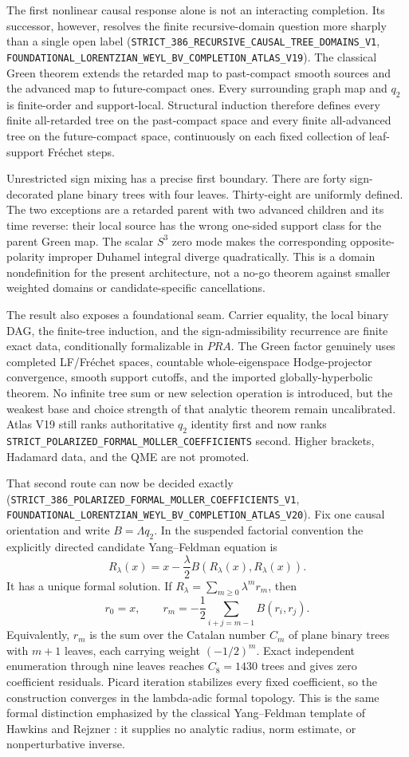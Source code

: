 \documentclass[11pt]{article}
\theoremstyle{definition}
\theoremstyle{remark}
\newcommand{\cert}[1]{\nolinkurl{#1}}
\begin{document}
The first nonlinear causal response alone is not an interacting completion.  Its successor,
however, resolves the finite recursive-domain question more sharply than a
single open label
(\cert{STRICT_386_RECURSIVE_CAUSAL_TREE_DOMAINS_V1},
\cert{FOUNDATIONAL_LORENTZIAN_WEYL_BV_COMPLETION_ATLAS_V19}).  The classical
Green theorem \cite{Baer2015} extends the retarded map to past-compact smooth sources and the
advanced map to future-compact ones.  Every surrounding graph map and
\(q_2\) is finite-order and support-local.  Structural induction therefore
defines every finite all-retarded tree on the past-compact space and every
finite all-advanced tree on the future-compact space, continuously on each
fixed collection of leaf-support Fréchet steps.

Unrestricted sign mixing has a precise first boundary.  There are forty
sign-decorated plane binary trees with four leaves.  Thirty-eight are
uniformly defined.  The two exceptions are a retarded parent with two
advanced children and its time reverse: their local source has the wrong
one-sided support class for the parent Green map.  The scalar \(S^3\) zero
mode makes the corresponding opposite-polarity improper Duhamel integral
diverge quadratically.  This is a domain nondefinition for the present
architecture, not a no-go theorem against smaller weighted domains or
candidate-specific cancellations.

The result also exposes a foundational seam.  Carrier equality, the local
binary DAG, the finite-tree induction, and the sign-admissibility recurrence
are finite exact data, conditionally formalizable in \(PRA\).  The Green
factor genuinely uses completed LF/Fréchet spaces, countable
whole-eigenspace Hodge-projector convergence, smooth support cutoffs, and the
imported globally-hyperbolic theorem.  No infinite tree sum or new selection
operation is introduced, but the weakest base and choice strength of that
analytic theorem remain uncalibrated.  Atlas V19 still ranks authoritative
\(q_2\) identity first and now ranks
\cert{STRICT_POLARIZED_FORMAL_MOLLER_COEFFICIENTS} second.  Higher brackets,
Hadamard data, and the QME are not promoted.

That second route can now be decided exactly
(\cert{STRICT_386_POLARIZED_FORMAL_MOLLER_COEFFICIENTS_V1},
\cert{FOUNDATIONAL_LORENTZIAN_WEYL_BV_COMPLETION_ATLAS_V20}).  Fix one causal
orientation and write $B=\Lambda q_2$.  In the suspended factorial
convention the explicitly directed candidate Yang--Feldman equation is
\[
 R_\lambda(x)=x-\frac{\lambda}{2}B(R_\lambda(x),R_\lambda(x)).
\]
It has a unique formal solution.  If
$R_\lambda=\sum_{m\geq0}\lambda^m r_m$, then
\[
 r_0=x,\qquad
 r_m=-\frac12\sum_{i+j=m-1}B(r_i,r_j).
\]
Equivalently, $r_m$ is the sum over the Catalan number $C_m$ of plane binary
trees with $m+1$ leaves, each carrying weight $(-1/2)^m$.  Exact independent
enumeration through nine leaves reaches $C_8=1430$ trees and gives zero
coefficient residuals.  Picard iteration stabilizes every fixed coefficient,
so the construction converges in the lambda-adic formal topology.  This is
the same formal distinction emphasized by the classical Yang--Feldman
template of Hawkins and Rejzner \cite{HawkinsRejzner2020}: it supplies no
analytic radius, norm estimate, or nonperturbative inverse.
\end{document}
